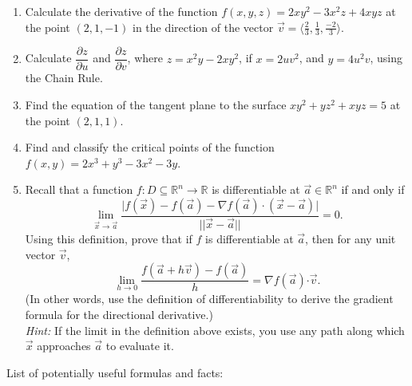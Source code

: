 \documentclass[12pt]{article}
\newcommand{\points}[1]{\marginpar{\hspace{24pt}[#1]}}
\newcommand{\R}{\mathbb{R}}
\newcommand{\pd}[2]{\dfrac{\partial #1}{\partial #2}}
\newcommand{\dotp}{\boldsymbol{\cdot}}
\begin{document}
\begin{enumerate}
\item Calculate the derivative of the function $f(x,y,z) = 2xy^2-3x^2z+4xyz$ at the point $(2,1,-1)$ in the direction of the vector $\vec{v} = \langle \frac{2}{3}, \frac{1}{3}, \frac{-2}{3}\rangle$. \points{8}

\newpage

\item Calculate $\pd{z}{u}$ and $\pd{z}{v}$, where $z = x^2y-2xy^2$, if $x=2uv^2$, and $y=4u^2v$, using the Chain Rule. \points{8}

\vspace{4in}

\item Find the equation of the tangent plane to the surface $xy^2+yz^2+xyz=5$ at the point $(2,1,1)$. \points{4}

\newpage



\item Find and classify the critical points of the function $f(x,y)=2x^3+y^3-3x^2-3y$.\points{12}

\newpage


\item Recall that a function $f:D\subseteq \R^n\to \R$ is differentiable at $\vec{a}\in \R^n$ if and only if
\begin{equation*}
\lim_{\vec{x}\rightarrow \vec{a}}\frac{\lvert f(\vec{x})-f(\vec{a}) - \nabla f(\vec{a})\cdot (\vec{x}-\vec{a})\rvert}{||\vec{x}-\vec{a}||} = 0.
\end{equation*}
Using this definition, prove that if $f$ is differentiable at $\vec{a}$, then for any unit vector $\vec{v}$,\points{6}
\[
 \lim_{h\to 0}\frac{f(\vec{a}+h\vec{v})-f(\vec{a})}{h} = \nabla f(\vec{a})\dotp \vec{v}.
\]
(In other words, use the definition of differentiability to derive the gradient formula for the directional derivative.)\\
{\em Hint:} If the limit in the definition above exists, you use any path along which $\vec{x}$ approaches $\vec{a}$ to evaluate it.
\end{enumerate}
\newpage

\begin{center}
List of potentially useful formulas and facts:
\end{center}
\end{document}
